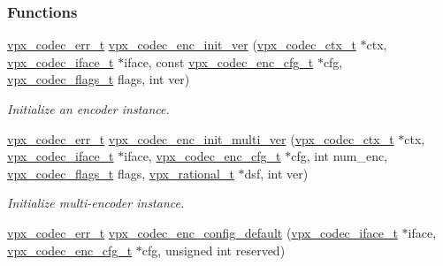 \subsubsection*{Functions}
\begin{DoxyCompactItemize}
\item 
\hyperlink{group__codec_gada1084710837ad363b92f2379dd2b8d2}{vpx\+\_\+codec\+\_\+err\+\_\+t} \hyperlink{group__encoder_ga1472ec347010fe5ef32766a299e57cc4}{vpx\+\_\+codec\+\_\+enc\+\_\+init\+\_\+ver} (\hyperlink{group__codec_gad03e2dfa6ae511db7d25be6bbb336233}{vpx\+\_\+codec\+\_\+ctx\+\_\+t} $\ast$ctx, \hyperlink{group__codec_gae99c3b04f4a567a311211cce3ae6b83b}{vpx\+\_\+codec\+\_\+iface\+\_\+t} $\ast$iface, const \hyperlink{group__encoder_ga946236c809e493b31a815d82db1e59db}{vpx\+\_\+codec\+\_\+enc\+\_\+cfg\+\_\+t} $\ast$cfg, \hyperlink{group__codec_ga3b36d5af89ddc463489fe5bde0a57877}{vpx\+\_\+codec\+\_\+flags\+\_\+t} flags, int ver)
\begin{DoxyCompactList}\small\item\em Initialize an encoder instance. \end{DoxyCompactList}\item 
\hyperlink{group__codec_gada1084710837ad363b92f2379dd2b8d2}{vpx\+\_\+codec\+\_\+err\+\_\+t} \hyperlink{group__encoder_ga1c0415984a5469687f53613a5471f53d}{vpx\+\_\+codec\+\_\+enc\+\_\+init\+\_\+multi\+\_\+ver} (\hyperlink{group__codec_gad03e2dfa6ae511db7d25be6bbb336233}{vpx\+\_\+codec\+\_\+ctx\+\_\+t} $\ast$ctx, \hyperlink{group__codec_gae99c3b04f4a567a311211cce3ae6b83b}{vpx\+\_\+codec\+\_\+iface\+\_\+t} $\ast$iface, \hyperlink{group__encoder_ga946236c809e493b31a815d82db1e59db}{vpx\+\_\+codec\+\_\+enc\+\_\+cfg\+\_\+t} $\ast$cfg, int num\+\_\+enc, \hyperlink{group__codec_ga3b36d5af89ddc463489fe5bde0a57877}{vpx\+\_\+codec\+\_\+flags\+\_\+t} flags, \hyperlink{group__encoder_ga2c08c6d71202024f17a5aef71a3d13e5}{vpx\+\_\+rational\+\_\+t} $\ast$dsf, int ver)
\begin{DoxyCompactList}\small\item\em Initialize multi-\/encoder instance. \end{DoxyCompactList}\item 
\hyperlink{group__codec_gada1084710837ad363b92f2379dd2b8d2}{vpx\+\_\+codec\+\_\+err\+\_\+t} \hyperlink{group__encoder_ga6cf8d0bbb663cd4df3a78d9eeb3bfb0e}{vpx\+\_\+codec\+\_\+enc\+\_\+config\+\_\+default} (\hyperlink{group__codec_gae99c3b04f4a567a311211cce3ae6b83b}{vpx\+\_\+codec\+\_\+iface\+\_\+t} $\ast$iface, \hyperlink{group__encoder_ga946236c809e493b31a815d82db1e59db}{vpx\+\_\+codec\+\_\+enc\+\_\+cfg\+\_\+t} $\ast$cfg, unsigned int reserved)

\end{DoxyCompactItemize}
